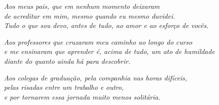 \vspace*{\fill}

\begin{flushright}
\textit{Aos meus pais, que em nenhum momento deixaram \\
de acreditar em mim, mesmo quando eu mesmo duvidei. \\
Tudo o que sou devo, antes de tudo, ao amor e ao esforço de vocês.}

\vspace{1.5em}

\textit{Aos professores que cruzaram meu caminho ao longo do curso \\
e me ensinaram que aprender é, acima de tudo, um ato de humildade \\
diante do quanto ainda há para descobrir.}

\vspace{1.5em}

\textit{Aos colegas de graduação, pela companhia nas horas difíceis, \\
pelas risadas entre um trabalho e outro, \\
e por tornarem essa jornada muito menos solitária.}
\end{flushright}

\vspace*{\fill}

